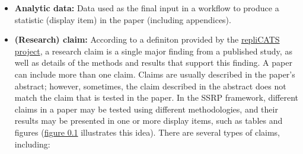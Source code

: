 \documentclass[
]{book}
\providecommand{\tightlist}{%
  \setlength{\itemsep}{0pt}\setlength{\parskip}{0pt}}
\begin{document}
\begin{itemize}
\tightlist
\item
  \textbf{Analytic data:} Data used as the final input in a workflow to produce a statistic (display item) in the paper (including appendices).\\
\item
  \textbf{(Research) claim:} According to a definiton provided by the \href{https://replicats.research.unimelb.edu.au/\#tab301}{repliCATS project}, a research claim is a single major finding from a published study, as well as details of the methods and results that support this finding. A paper can include more than one claim. Claims are usually described in the paper's abstract; however, sometimes, the claim described in the abstract does not match the claim that is tested in the paper.
  In the SSRP framework, different claims in a paper may be tested using different methodologies, and their results may be presented in one or more display items, such as tables and figures (\href{https://bitss.github.io/ACRE/intro.html\#fig:diagram}{figure 0.1} illustrates this idea). There are several types of claims, including:


\end{itemize}
\end{document}
